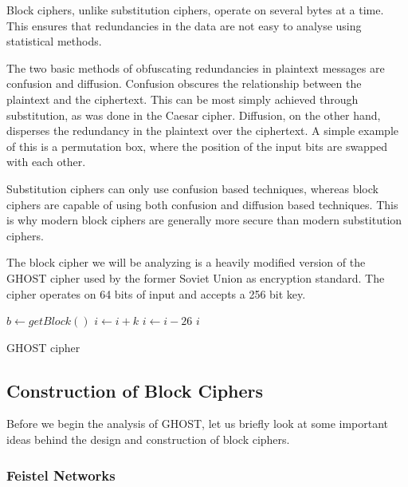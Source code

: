 \documentclass[12pt, a4paper, draft]{report}
\begin{document}
Block ciphers, unlike substitution ciphers, operate on several bytes at
a time. This ensures that redundancies in the data are not easy
to analyse using statistical methods.

The two basic methods of obfuscating redundancies in plaintext
messages are confusion and diffusion. Confusion obscures the relationship
between the plaintext and the ciphertext. This can be most simply achieved
through substitution, as was done in the Caesar cipher. Diffusion, on the
other hand, disperses the redundancy in the plaintext over the ciphertext.
A simple example of this is a permutation box, where the position of the
input bits are swapped with each other.

Substitution ciphers can only use confusion based techniques, whereas block
ciphers are capable of using both confusion and diffusion based techniques.
This is why modern block ciphers are generally more secure than modern
substitution ciphers.


The block cipher we will be analyzing is a heavily modified version of the
GHOST cipher used by the former Soviet Union as encryption standard. The
cipher operates on 64 bits of input and accepts a 256 bit key.

\begin{algorithm}
\begin{algorithmic}
    \State $b\gets getBlock()$
    \State $i\gets i + k$
        \State $i\gets i - 26$
    \EndIf
    \State \Return $i$
\end{algorithmic}
\caption{GHOST cipher}
\end{algorithm}

\subsection{Construction of Block Ciphers}

Before we begin the analysis of GHOST, let us briefly look at some important
ideas behind the design and construction of block ciphers.

\subsubsection{Feistel Networks}
\end{document}
